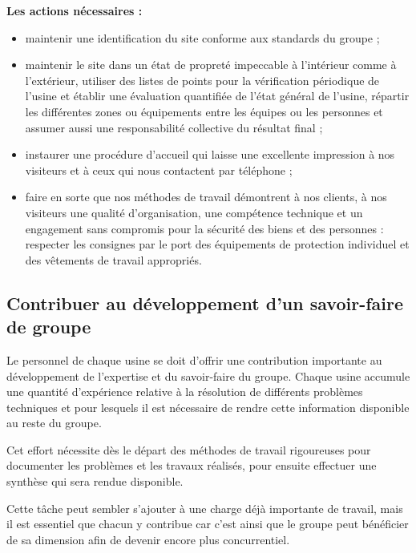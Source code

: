 \vspace{0.3cm}
\textbf{Les actions nécessaires :}
\begin{itemize}

\item maintenir une identification du site conforme aux standards du groupe ;
\item maintenir le site dans un état de propreté impeccable à l’intérieur comme à l’extérieur, utiliser des listes de points pour la vérification périodique de l’usine et établir une évaluation quantifiée de l’état général de l’usine, répartir les différentes zones ou équipements entre les équipes ou les personnes et assumer aussi une responsabilité collective du résultat final ;
\item instaurer une procédure d’accueil qui laisse une excellente impression à nos visiteurs et à ceux qui nous contactent par téléphone ;
\item faire en sorte que nos méthodes de travail démontrent à nos clients, à nos visiteurs une qualité d’organisation, une compétence technique et un engagement sans compromis pour la sécurité des biens et des personnes : respecter les consignes par le port des équipements de protection individuel et des vêtements de travail appropriés.

\end{itemize}

\subsection{Contribuer au développement d’un savoir-faire de groupe}

Le personnel de chaque usine se doit d’offrir une contribution importante au développement de l’expertise et du savoir-faire du groupe. Chaque usine accumule une quantité d’expérience relative à la résolution de différents problèmes techniques et pour lesquels il est nécessaire de rendre cette information disponible au reste du groupe.
\vspace{0.3cm} 

Cet effort nécessite dès le départ des méthodes de travail rigoureuses pour documenter les problèmes et les travaux réalisés, pour ensuite effectuer une synthèse qui sera rendue disponible.
\vspace{0.3cm} 

Cette tâche peut sembler s’ajouter à une charge déjà importante de travail, mais il est essentiel que chacun y contribue car c’est ainsi que le groupe peut bénéficier de sa dimension afin de devenir encore plus concurrentiel.
\vspace{0.3cm} 


